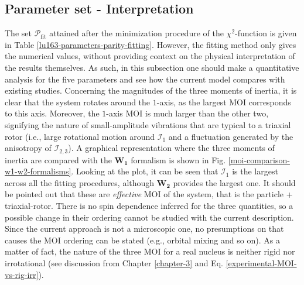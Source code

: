 \subsection{Parameter set - Interpretation}

The set $\mathcal{P}_\text{fit}$ attained after the minimization procedure of the $\chi^2$-function is given in Table \ref{lu163-parameters-parity-fitting}. However, the fitting method only gives the numerical values, without providing context on the physical interpretation of the results themselves. As such, in this subsection one should make a quantitative analysis for the five parameters and see how the current model compares with existing studies. Concerning the magnitudes of the three moments of inertia, it is clear that the system rotates around the $1$-axis, as the largest MOI corresponds to this axis. Moreover, the $1$-axis MOI is much larger than the other two, signifying the nature of small-amplitude vibrations that are typical to a triaxial rotor (i.e., large rotational motion around $\mathcal{I}_1$ and a fluctuation generated by the anisotropy of $\mathcal{I}_{2,3}$). A graphical representation where the three moments of inertia are compared with the $\mathbf{W_1}$ formalism is shown in Fig. \ref{moi-comparison-w1-w2-formalisms}. Looking at the plot, it can be seen that $\mathcal{I}_1$ is the largest across all the fitting procedures, although $\mathbf{W_2}$ provides the largest one. It should be pointed out that these are \emph{effective} MOI of the system, that is the particle + triaxial-rotor. There is no spin dependence inferred for the three quantities, so a possible change in their ordering cannot be studied with the current description. Since the current approach is not a microscopic one, no presumptions on that causes the MOI ordering can be stated (e.g., orbital mixing and so on). As a matter of fact, the nature of the three MOI for a real nucleus is neither rigid nor irrotational (see discussion from Chapter \ref{chapter-3} and Eq. \ref{experimental-MOI-vs-rig-irr}).
